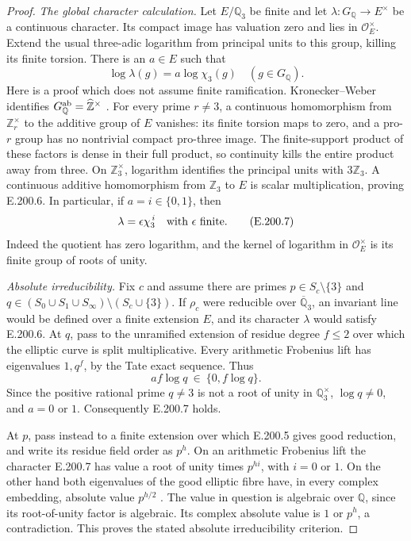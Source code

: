 \begin{proof}
\emph{The global character calculation.}
Let \(E/\mathbb Q_3\) be finite and let
\(\lambda:G_{\mathbb Q}\to E^\times\) be a continuous character.
Its compact image has valuation zero and lies in
\(\mathcal O_E^\times\).  Extend the usual three-adic logarithm
from principal units to this group, killing its finite torsion.
There is an \(a\in E\) such that
\[
                   \log\lambda(g)=a\log\chi_3(g)
                   \quad(g\in G_{\mathbb Q}).
\tag{E.200.6}
\]
Here is a proof which does not assume finite ramification.
Kronecker--Weber identifies
\(G_{\mathbb Q}^{\rm ab}=\widehat{\mathbb Z}^{\times}\)
\citep[I, Theorem 4.16, pp.49--50]{RootMilneCFT}.
For every prime \(r\ne3\), a continuous homomorphism from
\(\mathbb Z_r^\times\) to the additive group of \(E\) vanishes:
its finite torsion maps to zero, and a pro-\(r\) group has no
nontrivial compact pro-three image.  The finite-support product
of these factors is dense in their full product, so continuity
kills the entire product away from three.  On
\(\mathbb Z_3^\times\), logarithm identifies the principal units
with \(3\mathbb Z_3\).  A continuous additive homomorphism from
\(\mathbb Z_3\) to \(E\) is scalar multiplication, proving
E.200.6.  In particular, if \(a=i\in\{0,1\}\), then
\[
                       \lambda=\epsilon\chi_3^{\,i}
                       \quad\hbox{with \(\epsilon\) finite}.
\tag{E.200.7}
\]
Indeed the quotient has zero logarithm, and the kernel of logarithm
in \(\mathcal O_E^\times\) is its finite group of roots of unity.

\emph{Absolute irreducibility.}
Fix \(c\) and assume there are primes \(p\in S_c\setminus\{3\}\)
and \(q\in(S_0\cup S_1\cup S_\infty)\setminus(S_c\cup\{3\})\).
If \(\rho_c\) were reducible over \(\overline{\mathbb Q}_3\),
an invariant line would be defined over a finite extension \(E\),
and its character \(\lambda\) would satisfy E.200.6.  At \(q\),
pass to the unramified extension of residue degree \(f\le2\)
over which the elliptic curve is split multiplicative.  Every
arithmetic Frobenius lift has eigenvalues \(1,q^f\), by the Tate
exact sequence.  Thus
\[
                       a f\log q\ \in\ \{0,f\log q\}.
\]
Since the positive rational prime \(q\ne3\) is not a root of
unity in \(\mathbb Q_3^\times\), \(\log q\ne0\), and
\(a=0\) or \(1\).  Consequently E.200.7 holds.

At \(p\), pass instead to a finite extension over which
E.200.5 gives good reduction, and write its residue field order
as \(p^h\).  On an arithmetic Frobenius lift the character
E.200.7 has value a root of unity times \(p^{hi}\), with
\(i=0\) or \(1\).  On the other hand both eigenvalues of the
good elliptic fibre have, in every complex embedding, absolute
value \(p^{h/2}\)
\citep[V.2, Theorem 2.3.1, pp.142--143]{AuditSilverman2009}.
The value in question is algebraic over \(\mathbb Q\), since its
root-of-unity factor is algebraic.  Its complex absolute value
is \(1\) or \(p^h\), a contradiction.  This proves the stated
absolute irreducibility criterion.


\end{proof}

